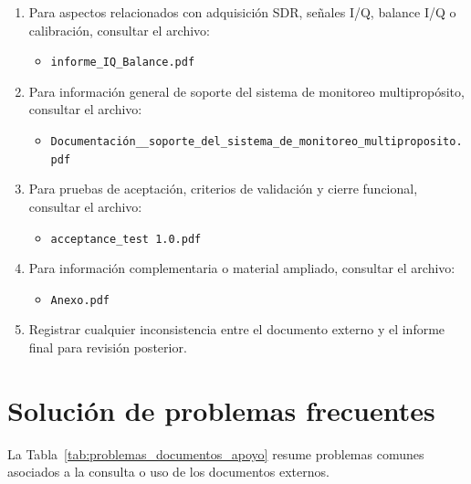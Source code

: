 \begin{enumerate}
    \item Para aspectos relacionados con adquisición SDR, señales I/Q, balance I/Q o calibración, consultar el archivo:
    \begin{itemize}
        \item \texttt{informe\_IQ\_Balance.pdf}
    \end{itemize}
    
    \item Para información general de soporte del sistema de monitoreo multipropósito, consultar el archivo:
    \begin{itemize}
        \item \texttt{Documentación\_\_soporte\_del\_sistema\_de\_monitoreo\_multiproposito.pdf}
    \end{itemize}
    
    \item Para pruebas de aceptación, criterios de validación y cierre funcional, consultar el archivo:
    \begin{itemize}
        \item \texttt{acceptance\_test 1.0.pdf}
    \end{itemize}
    
    \item Para información complementaria o material ampliado, consultar el archivo:
    \begin{itemize}
        \item \texttt{Anexo.pdf}
    \end{itemize}
    
    \item Registrar cualquier inconsistencia entre el documento externo y el informe final para revisión posterior.
\end{enumerate}

\section{Solución de problemas frecuentes}

La Tabla~\ref{tab:problemas_documentos_apoyo} resume problemas comunes asociados a la consulta o uso de los documentos externos.

